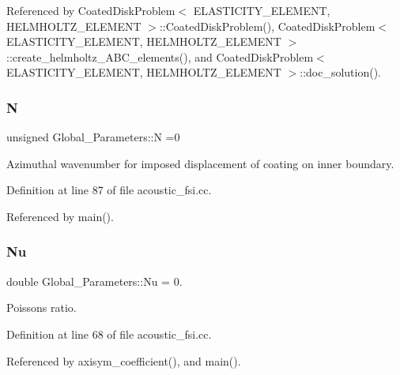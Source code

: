 Referenced by Coated\+Disk\+Problem$<$ E\+L\+A\+S\+T\+I\+C\+I\+T\+Y\+\_\+\+E\+L\+E\+M\+E\+N\+T, H\+E\+L\+M\+H\+O\+L\+T\+Z\+\_\+\+E\+L\+E\+M\+E\+N\+T $>$\+::\+Coated\+Disk\+Problem(), Coated\+Disk\+Problem$<$ E\+L\+A\+S\+T\+I\+C\+I\+T\+Y\+\_\+\+E\+L\+E\+M\+E\+N\+T, H\+E\+L\+M\+H\+O\+L\+T\+Z\+\_\+\+E\+L\+E\+M\+E\+N\+T $>$\+::create\+\_\+helmholtz\+\_\+\+A\+B\+C\+\_\+elements(), and Coated\+Disk\+Problem$<$ E\+L\+A\+S\+T\+I\+C\+I\+T\+Y\+\_\+\+E\+L\+E\+M\+E\+N\+T, H\+E\+L\+M\+H\+O\+L\+T\+Z\+\_\+\+E\+L\+E\+M\+E\+N\+T $>$\+::doc\+\_\+solution().

\mbox{\label{namespaceGlobal__Parameters_aff31353c09f439f3d537ad06ce868787}} 
\subsubsection{\texorpdfstring{N}{N}}
{\footnotesize\ttfamily unsigned Global\+\_\+\+Parameters\+::N =0}



Azimuthal wavenumber for imposed displacement of coating on inner boundary. 



Definition at line 87 of file acoustic\+\_\+fsi.\+cc.



Referenced by main().

\mbox{\label{namespaceGlobal__Parameters_a20fccdcfa2c15ad8b951b9ada3bb1661}} 
\subsubsection{\texorpdfstring{Nu}{Nu}}
{\footnotesize\ttfamily double Global\+\_\+\+Parameters\+::\+Nu = 0.}



Poisson\textquotesingle{}s ratio. 



Definition at line 68 of file acoustic\+\_\+fsi.\+cc.



Referenced by axisym\+\_\+coefficient(), and main().

\mbox{\label{namespaceGlobal__Parameters_af9e1e178dfb7f5e35b452599bd4c4324}} 
